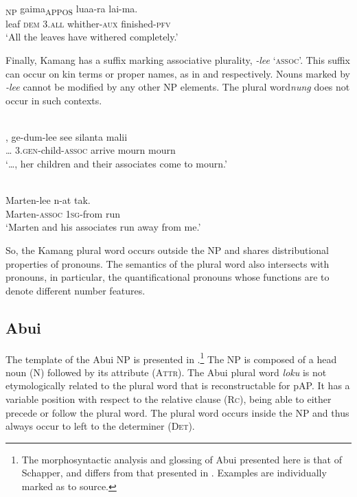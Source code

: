 \ea%
\label{ex:9:43}
 \\
\textsubscript{NP} {gaima}\textsubscript{APPOS} luaa-ra lai-ma{.}\\
    leaf \textsc{dem}   3.\textsc{all} whither-\textsc{aux} finished-\textsc{pfv}\\
\glt `All the leaves have withered completely.'
\z






Finally, Kamang has a suffix marking associative plurality, \textit{-lee} `\textsc{assoc}'. This suffix can occur on kin terms or proper names, as in  and  respectively. Nouns marked by \textit{-lee} cannot be modified by any other NP elements. The plural word\textit{nung} does not occur in such contexts.


\ea%
\label{ex:9:44}
 \\
\gll  {\dots},   ge-dum-lee see silanta malii \\
  {\dots} 3.\textsc{gen}-child-\textsc{assoc} arrive mourn mourn \\
\glt `{\dots}, her children and their associates come to mourn.'
\z







\ea%
\label{ex:9:45}
 \\
\gll  Marten-lee n-at tak.  \\
  Marten-\textsc{assoc} 1\textsc{sg}-from run   \\
\glt `Marten and his associates run away from me.'
\z






So, the Kamang plural word occurs outside the NP and shares distributional properties of pronouns. The semantics of the plural word also intersects with pronouns, in particular, the quantificational pronouns whose functions are to denote different number features.

\subsection{Abui} %
\label{sec:9:3.4}
The template of the Abui NP is presented in .\footnote{  The morphosyntactic analysis and glossing of Abui presented here is that of Schapper, and differs from that presented in \citet{Kratochvil2007}. Examples are individually marked as to source.} The NP is composed of a head noun (N) followed by its attribute (\textsc{Attr).} The Abui plural word \textit{loku} is not etymologically related to the plural word that is reconstructable for pAP. It has a variable position with respect to the relative clause (\textsc{Rc}), being able to either precede or follow the plural word. The plural word occurs inside the NP and thus always occur to left to the determiner (\textsc{Det).}

